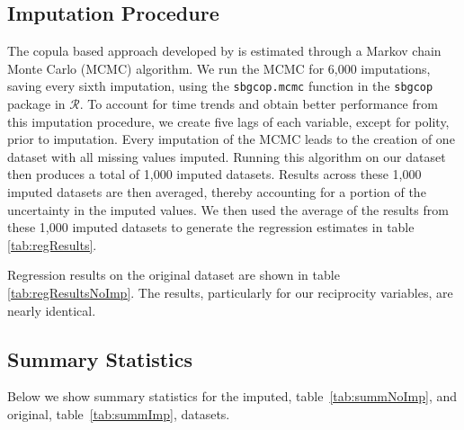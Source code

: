 \subsection*{Imputation Procedure}
\label{appImp}

The copula based approach developed by \citet{hoff:2007} is estimated through a Markov chain Monte Carlo (MCMC) algorithm. We run the MCMC for 6,000 imputations, saving every sixth imputation, using the \texttt{sbgcop.mcmc} function in the \texttt{sbgcop} package in $\mathcal{R}$. To account for time trends and obtain better performance from this imputation procedure, we create five lags of each variable, except for polity, prior to imputation. Every imputation of the MCMC leads to the creation of one dataset with all missing values imputed. Running this algorithm on our dataset then produces a total of 1,000 imputed datasets. Results across these 1,000 imputed datasets are then averaged, thereby accounting for a portion of the uncertainty in the imputed values. We then used the average of the results from these 1,000 imputed datasets to generate the regression estimates in table \ref{tab:regResults}. 


\FloatBarrier

Regression results on the original dataset are shown in table \ref{tab:regResultsNoImp}. The results, particularly for our reciprocity variables, are nearly identical. 

\newpage

\subsection*{Summary Statistics}
\label{appSumm}

Below we show summary statistics for the imputed, table~\ref{tab:summNoImp}, and original, table~\ref{tab:summImp}, datasets.


\FloatBarrier


\FloatBarrier

\newpage
